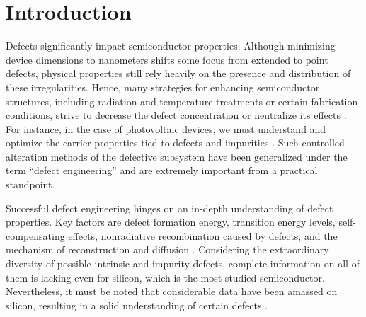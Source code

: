 \documentclass{WileyMSP-template}
\begin{document}


\section{Introduction}

Defects significantly impact semiconductor properties.
Although minimizing device dimensions to nanometers shifts some focus from extended to point defects,
physical properties still rely heavily on the presence and distribution of these irregularities.
Hence, many strategies for enhancing semiconductor structures, including radiation and temperature treatments or certain fabrication conditions, strive to decrease the defect concentration or neutralize its effects \cite{Cai2023,Vobecky2021,Frascaroli2021}.
For instance, in the case of photovoltaic devices, we must understand and optimize the carrier properties tied to defects and impurities  \cite{Cai2023}.
Such controlled alteration methods of the defective subsystem have been generalized under the term ``defect engineering'' and are extremely important from a practical standpoint.

Successful defect engineering hinges on an in-depth understanding of defect properties.
Key factors are defect formation energy, transition energy levels, self-compensating effects, nonradiative recombination caused by defects,
and the mechanism of reconstruction and diffusion  \cite{Cai2023}.
Considering the extraordinary diversity of possible intrinsic and impurity defects, complete information on all of them is lacking even for silicon, which is the most studied semiconductor.
Nevertheless, it must be noted that considerable data have been amassed on silicon, resulting in a solid understanding of certain defects \cite{Juhl2018}.
\end{document}
